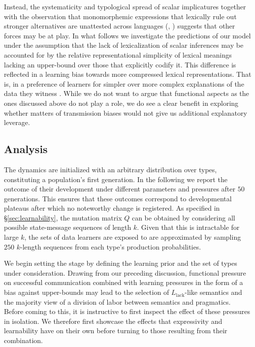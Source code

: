 \documentclass[a4paper]{article}
\newcommand{\mylang}[1]{\ensuremath{L_{\text{#1}}}\xspace} %
\newcommand{\Llack}{\mylang{lack}}
\begin{document}
Instead, the systematicity and typological spread of scalar implicatures together with the observation that monomorphemic expressions that lexically rule out stronger alternatives are unattested across languages (\citealt[252-267]{horn:1984}, \citealt{horn:1972,traugott:2004,vdAuwera:2010}) suggests that other forces may be at play. In what follows we investigate the predictions of our model under the assumption that the lack of lexicalization of scalar inferences may be accounted for by the relative representational simplicity of lexical meanings lacking an upper-bound over those that explicitly codify it. This difference is reflected in a learning bias towards more compressed lexical representations. That is, in a preference of learners for simpler over more complex explanations of the data they witness \citep{feldman:2000, chater+vitanyi:2003, piantadosi+etal:2012a, kirby+etal:2015,piantadosi+etal:underreview}. While we do not want to argue that functional aspects as the ones discussed above do not play a role, we do see a clear benefit in exploring whether matters of transmission biases would not give us additional explanatory leverage.


\subsection{Analysis}
The dynamics are initialized with an arbitrary distribution over types, constituting a population's first generation. In the following we report the outcome of their development under different parameters and pressures after $50$ generations. This ensures that these outcomes correspond to developmental plateaus after which no noteworthy change is registered. As specified in \S\ref{sec:learnability}, the mutation matrix $Q$ can be obtained by considering all possible state-message sequences of length $k$. Given that this is intractable for large $k$, the sets of data learners are exposed to are approximated by sampling $250$ $k$-length sequences from each type's production probabilities. 

We begin setting the stage by defining the learning prior and the set of types under consideration. Drawing from our preceding discussion, functional pressure on successful communication combined with learning pressures in the form of a bias against upper-bounds may lead to the selection of $\Llack$-like semantics and the majority view of a division of labor between semantics and pragmatics. Before coming to this, it is instructive to first inspect the effect of these pressures in isolation. We therefore first showcase the effects that expressivity and learnability have on their own before turning to those resulting from their combination. 
\end{document}
